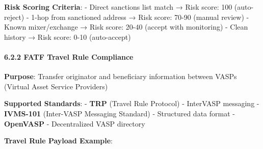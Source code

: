 \documentclass[
  11pt,
]{article}
\newenvironment{Shaded}{\begin{snugshade}}{\end{snugshade}}
\newcommand{\DataTypeTok}[1]{\textcolor[rgb]{0.13,0.29,0.53}{#1}}
\newcommand{\DecValTok}[1]{\textcolor[rgb]{0.00,0.00,0.81}{#1}}
\newcommand{\ErrorTok}[1]{\textcolor[rgb]{0.64,0.00,0.00}{\textbf{#1}}}
\newcommand{\FunctionTok}[1]{\textcolor[rgb]{0.00,0.00,0.00}{#1}}
\newcommand{\KeywordTok}[1]{\textcolor[rgb]{0.13,0.29,0.53}{\textbf{#1}}}
\newcommand{\StringTok}[1]{\textcolor[rgb]{0.31,0.60,0.02}{#1}}
\begin{document}
\textbf{Risk Scoring Criteria}: - Direct sanctions list match → Risk
score: 100 (auto-reject) - 1-hop from sanctioned address → Risk score:
70-90 (manual review) - Known mixer/exchange → Risk score: 20-40 (accept
with monitoring) - Clean history → Risk score: 0-10 (auto-accept)

\hypertarget{fatf-travel-rule-compliance}{%
\paragraph{6.2.2 FATF Travel Rule
Compliance}\label{fatf-travel-rule-compliance}}

\textbf{Purpose}: Transfer originator and beneficiary information
between VASPs (Virtual Asset Service Providers)

\textbf{Supported Standards}: - \textbf{TRP} (Travel Rule Protocol) -
InterVASP messaging - \textbf{IVMS-101} (Inter-VASP Messaging Standard)
- Structured data format - \textbf{OpenVASP} - Decentralized VASP
directory

\textbf{Travel Rule Payload Example}:

\begin{Shaded}
\end{Shaded}
\end{document}
